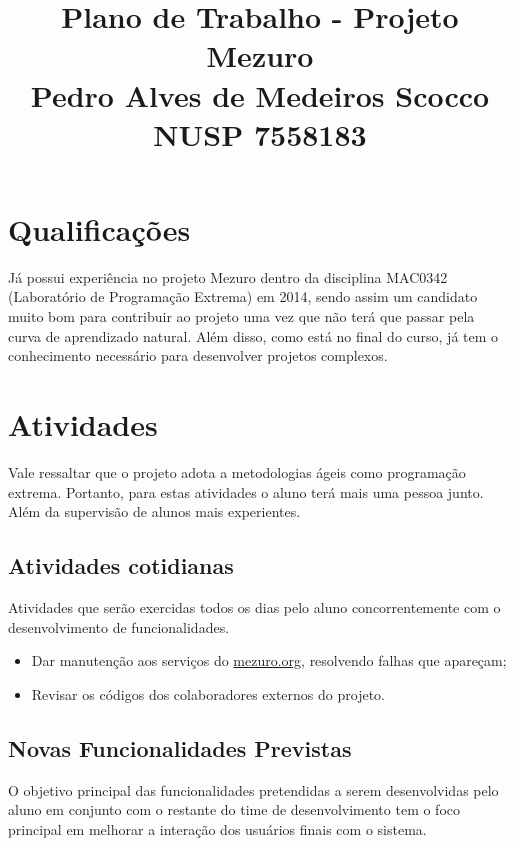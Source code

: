 \documentclass[12pt]{article}
\begin{document}
  \title{Plano de Trabalho - Projeto Mezuro\\
         Pedro Alves de Medeiros Scocco\\
         NUSP 7558183}

  \maketitle

  \section{Qualificações}
  Já possui experiência no projeto Mezuro dentro da disciplina MAC0342 (Laboratório de Programação Extrema) em 2014, sendo assim um candidato muito bom para contribuir ao projeto uma vez que não terá que passar pela curva de aprendizado natural. Além disso, como está no final do curso, já tem o conhecimento necessário para desenvolver projetos complexos.

  \section{Atividades}
    Vale ressaltar que o projeto adota a metodologias ágeis como programação extrema. Portanto, para estas atividades o aluno terá mais uma pessoa junto. Além da supervisão de alunos mais experientes.

    \subsection{Atividades cotidianas}
      Atividades que serão exercidas todos os dias pelo aluno concorrentemente com o desenvolvimento de funcionalidades.

      \begin{itemize}
        \item Dar manutenção aos serviços do \url{mezuro.org}, resolvendo falhas que apareçam;
        \item Revisar os códigos dos colaboradores externos do projeto.
      \end{itemize}

    \subsection{Novas Funcionalidades Previstas}\label{subsec:func-prev}
      O objetivo principal das funcionalidades pretendidas a serem desenvolvidas pelo aluno em conjunto com o restante do time de desenvolvimento tem o foco principal em melhorar a interação dos usuários finais com o sistema.
\end{document}
